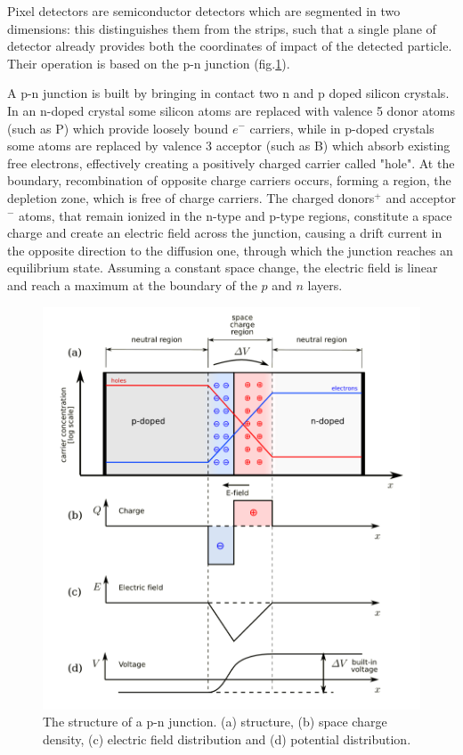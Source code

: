 Pixel detectors are semiconductor detectors which are segmented in two dimensions: this distinguishes them from the strips, such that a single plane of detector already provides both the coordinates of impact of the detected particle. 
Their operation is based on the p-n junction (fig.\ref{fig:junction}). 

A p-n junction is built by bringing in contact two n and p doped silicon crystals.
In an n-doped crystal some silicon atoms are replaced with valence 5 donor atoms (such as P) which provide loosely bound $e^-$ carriers, while in p-doped crystals some atoms are replaced by valence 3 acceptor (such as B) which absorb existing free electrons, effectively creating a positively charged carrier called "hole".
At the boundary, recombination of opposite charge carriers occurs, forming a region, the depletion zone, which is free of charge carriers. The charged donors$^{+}$ and acceptor$^{-}$ atoms, that remain ionized in the n-type and p-type regions, constitute a space charge and create an electric field across the junction, causing a drift current in the opposite direction to the diffusion one, through which the junction reaches an equilibrium state. Assuming a constant space change, the electric field is linear and reach a maximum at the boundary of the $p$ and $n$ layers.
\begin{figure}[h!]
   \centering
   \includegraphics[width=.69\linewidth]{figures/Pixel_detectors/junction.png}
   \caption{The structure of a p-n junction. (a) structure, (b) space charge density, (c) electric field distribution and (d) potential distribution. }
   \label{fig:junction}
\end{figure}

